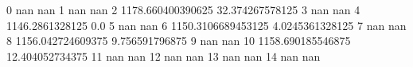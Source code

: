 0 nan nan
1 nan nan
2 1178.660400390625 32.374267578125
3 nan nan
4 1146.2861328125 0.0
5 nan nan
6 1150.3106689453125 4.0245361328125
7 nan nan
8 1156.042724609375 9.756591796875
9 nan nan
10 1158.690185546875 12.404052734375
11 nan nan
12 nan nan
13 nan nan
14 nan nan
